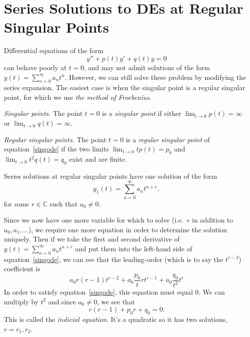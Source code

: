 \documentclass[10pt,driverfallback=hypertex]{report}
\newcounter{small}
\begin{document}
\chapter{Series Solutions to DEs at Regular Singular Points}

Differential equations of the form
\begin{dmath}
  \label{singode}
  y'' + p(t)y' + q(t)y=0
\end{dmath}
can behave poorly at $t=0$, and may not admit solutions of the form
$y(t) =\sum_{n=0}^\infty a_n t^n$. However, we can still solve these
problem by modifying the series expansion. The easiest case is when
the singular point is a regular singular point, for which we use
\emph{the method of Froebenius}.

\begin{definition}\emph{Singular points.}
  The point $t=0$ is a \emph{singular point} if either $\lim_{t
    \rightarrow 0}p(t)=\infty$ or $\lim_{t \rightarrow 0}q(t)=\infty$.
\end{definition}

\begin{definition}\emph{Regular singular points.}
  The point $t=0$ is a \emph{regular singular point} of
  equation~\eqref{singode} if the two limits $\lim_{t\rightarrow 0} t p(t)
  =p_0$ and $\lim_{t\rightarrow 0} t^2 q(t) =q_0$ exist and are
  finite.
\end{definition}

Series solutions at regular singular points have one solution of the form
\begin{dmath*}
  \boxed{y_1(t) = \sum_{n=0}^\infty a_n t^{n+r}},
\end{dmath*}
for some $r\in\mathbb{C}$ such that $a_0 \neq 0$.

Since we now have one more variable for which to solve (i.e.\ $r$ in addition
to $a_0, a_1,\dots$), we require one more equation in order to determine the
solution uniquely. Then if we take the first and second derivative of
$y(t) = \sum_{n=0}^\infty a_n t^{n+r}$ and put them into the left-hand side of
equation~\eqref{singode}, we can see that the
leading-order (which is to say the $t^{r-2}$) coefficient is
\begin{dmath*}
  a_0 r(r-1)t^{r-2} + a_0 \frac{p_0}{t} r t^{r-1} + a_0 \frac{q_0}{t^2} t^r
\end{dmath*}
In order to satisfy equation~\eqref{singode}, this equation must equal $0$.
We can multiply by $t^2$ and since $a_0 \neq 0$, we see that
\begin{dmath*}
  \boxed{r(r-1) + p_0 r  + q_0=0.}
\end{dmath*}
This is called the \emph{indicial equation}. It's a quadratic so it has two
solutions, $r=r_1,r_2$.
\end{document}
